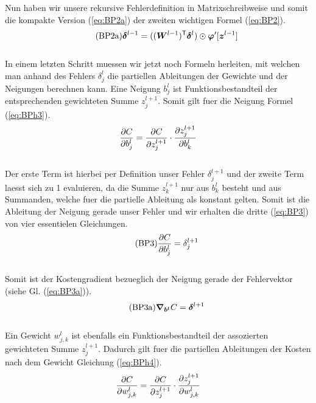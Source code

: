 Nun haben wir unsere rekursive Fehlerdefinition in Matrixschreibweise und somit
die kompakte Version (\ref{eq:BP2a}) der zweiten wichtigen Formel (\ref{eq:BP2}).
\\
\begin{equation}\tag{BP2a}\label{eq:BP2a}
  \bm{\delta}^{l-1} = ((\bm{W}^{l-1})^{\mathsf{T}} \bm{\delta}^l) \odot \bm{\varphi}'[\bm{z}^{l-1}]
\end{equation}
\\
In einem letzten Schritt muessen wir jetzt noch Formeln herleiten, mit welchen
man anhand des Fehlers $\delta_j^l$ die partiellen Ableitungen der Gewichte und
der Neigungen berechnen kann.
\para{}
Eine Neigung $b_j^l$ ist Funktionsbestandteil der entsprechenden gewichteten
Summe $z_j^{l+1}$. Somit gilt fuer die Neigung Formel (\ref{eq:BPh3}).
\\
\begin{equation}\label{eq:BPh3}
  \frac{\partial C}{\partial b_j^l} = \frac{\partial C}{\partial z_j^{l+1}} \cdot \frac{\partial z_j^{l+1}}{\partial b_k^l}
\end{equation}
\\
Der erste Term ist hierbei per Definition unser Fehler $\delta_j^{l+1}$ und der
zweite Term laesst sich zu 1 evaluieren, da die Summe $z_k^{l+1}$ nur aus
$b_k^l$ besteht und aus Summanden, welche fuer die partielle Ableitung als konstant gelten.
Somit ist die Ableitung der Neigung gerade unser Fehler und wir erhalten die
dritte (\ref{eq:BP3}) von vier essentielen Gleichungen.
\\
\begin{equation}\tag{BP3}\label{eq:BP3}
  \frac{\partial C}{\partial b_j^l} = \delta_j^{l+1}
\end{equation}
\\
Somit ist der Kostengradient bezueglich der Neigung gerade der Fehlervektor
(siehe Gl. (\ref{eq:BP3a})).
\\
\begin{equation}\tag{BP3a}\label{eq:BP3a}
  \bm{\nabla}_{\bm{b^l}} C =  \bm{\delta}^{l+1}
\end{equation}
\\
Ein Gewicht $w_{j,k}^l$ ist ebenfalls ein Funktionsbestandteil der assozierten
gewichteten Summe $z_j^{l+1}$. Dadurch gilt fuer die partiellen Ableitungen der
Kosten nach dem Gewicht Gleichung (\ref{eq:BPh4}).
\\
\begin{equation}\label{eq:BPh4}
  \frac{\partial C}{\partial w_{j,k}^l} = \frac{\partial C}{\partial z_j^{l+1}} \cdot \frac{\partial z_j^{l+1}}{\partial w_{j,k}^l}
\end{equation}
